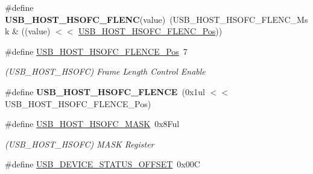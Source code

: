 \begin{DoxyCompactItemize}
\item 
\hypertarget{group___s_a_m_l21___u_s_b_gaffe516be7c47311e5a0c55ba0e069053}{}\#define {\bfseries U\+S\+B\+\_\+\+H\+O\+S\+T\+\_\+\+H\+S\+O\+F\+C\+\_\+\+F\+L\+E\+N\+C}(value)~(U\+S\+B\+\_\+\+H\+O\+S\+T\+\_\+\+H\+S\+O\+F\+C\+\_\+\+F\+L\+E\+N\+C\+\_\+\+Msk \& ((value) $<$$<$ \hyperlink{group___s_a_m_l21___u_s_b_gaa7d764b82c769e5fba6b45dc17587826}{U\+S\+B\+\_\+\+H\+O\+S\+T\+\_\+\+H\+S\+O\+F\+C\+\_\+\+F\+L\+E\+N\+C\+\_\+\+Pos}))\label{group___s_a_m_l21___u_s_b_gaffe516be7c47311e5a0c55ba0e069053}

\item 
\hypertarget{group___s_a_m_l21___u_s_b_ga7f3fe2713c71363a782be75f4f90a0c0}{}\#define \hyperlink{group___s_a_m_l21___u_s_b_ga7f3fe2713c71363a782be75f4f90a0c0}{U\+S\+B\+\_\+\+H\+O\+S\+T\+\_\+\+H\+S\+O\+F\+C\+\_\+\+F\+L\+E\+N\+C\+E\+\_\+\+Pos}~7\label{group___s_a_m_l21___u_s_b_ga7f3fe2713c71363a782be75f4f90a0c0}

\begin{DoxyCompactList}\small\item\em (U\+S\+B\+\_\+\+H\+O\+S\+T\+\_\+\+H\+S\+O\+F\+C) Frame Length Control Enable \end{DoxyCompactList}\item 
\hypertarget{group___s_a_m_l21___u_s_b_gabf578f7db74f789fcf32027a2a905503}{}\#define {\bfseries U\+S\+B\+\_\+\+H\+O\+S\+T\+\_\+\+H\+S\+O\+F\+C\+\_\+\+F\+L\+E\+N\+C\+E}~(0x1ul $<$$<$ U\+S\+B\+\_\+\+H\+O\+S\+T\+\_\+\+H\+S\+O\+F\+C\+\_\+\+F\+L\+E\+N\+C\+E\+\_\+\+Pos)\label{group___s_a_m_l21___u_s_b_gabf578f7db74f789fcf32027a2a905503}

\item 
\hypertarget{group___s_a_m_l21___u_s_b_gaf620d1f4e2ddb86529c1f7a029defbca}{}\#define \hyperlink{group___s_a_m_l21___u_s_b_gaf620d1f4e2ddb86529c1f7a029defbca}{U\+S\+B\+\_\+\+H\+O\+S\+T\+\_\+\+H\+S\+O\+F\+C\+\_\+\+M\+A\+S\+K}~0x8\+Ful\label{group___s_a_m_l21___u_s_b_gaf620d1f4e2ddb86529c1f7a029defbca}

\begin{DoxyCompactList}\small\item\em (U\+S\+B\+\_\+\+H\+O\+S\+T\+\_\+\+H\+S\+O\+F\+C) M\+A\+S\+K Register \end{DoxyCompactList}\item 
\hypertarget{group___s_a_m_l21___u_s_b_ga2c0b2114ca5448062c1cae9f07a9271d}{}\#define \hyperlink{group___s_a_m_l21___u_s_b_ga2c0b2114ca5448062c1cae9f07a9271d}{U\+S\+B\+\_\+\+D\+E\+V\+I\+C\+E\+\_\+\+S\+T\+A\+T\+U\+S\+\_\+\+O\+F\+F\+S\+E\+T}~0x00\+C\label{group___s_a_m_l21___u_s_b_ga2c0b2114ca5448062c1cae9f07a9271d}


\end{DoxyCompactItemize}
